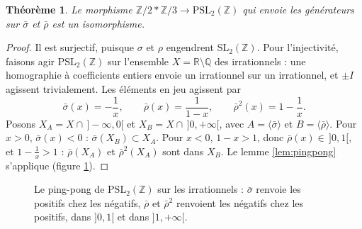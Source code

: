 \documentclass[11pt,a4paper]{article}
\theoremstyle{plain}
\newtheorem{theoreme}{Théorème}[section]
\theoremstyle{definition}
\theoremstyle{remark}
\newcommand{\Z}{\mathbb{Z}}
\newcommand{\Q}{\mathbb{Q}}
\newcommand{\R}{\mathbb{R}}
\newcommand{\SL}{\mathrm{SL}}
\newcommand{\PSL}{\mathrm{PSL}}
\begin{document}
\begin{theoreme}\label{thm:pingpong}
Le morphisme $\Z/2*\Z/3\to\PSL_2(\Z)$ qui envoie les générateurs sur $\bar\sigma$ et $\bar\rho$ est un isomorphisme.
\end{theoreme}

\begin{proof}
Il est surjectif, puisque $\sigma$ et $\rho$ engendrent $\SL_2(\Z)$. Pour l'injectivité, faisons agir $\PSL_2(\Z)$ sur l'ensemble $X=\R\setminus\Q$ des irrationnels : une homographie à coefficients entiers envoie un irrationnel sur un irrationnel, et $\pm I$ agissent trivialement. Les éléments en jeu agissent par
\[
  \bar\sigma(x)=-\frac1x,\qquad \bar\rho(x)=\frac1{1-x},\qquad \bar\rho^2(x)=1-\frac1x .
\]
Posons $X_A=X\cap\,]-\infty,0[$ et $X_B=X\cap\,]0,+\infty[$, avec $A=\langle\bar\sigma\rangle$ et $B=\langle\bar\rho\rangle$. Pour $x>0$, $\bar\sigma(x)<0$ : $\bar\sigma(X_B)\subset X_A$. Pour $x<0$, $1-x>1$, donc $\bar\rho(x)\in\,]0,1[$, et $1-\frac1x>1$ : $\bar\rho(X_A)$ et $\bar\rho^2(X_A)$ sont dans $X_B$. Le lemme \ref{lem:pingpong} s'applique (figure \ref{fig:pingpong}).
\end{proof}

\begin{figure}[h]
\centering
{}
\caption{Le ping-pong de $\PSL_2(\Z)$ sur les irrationnels : $\bar\sigma$ renvoie les positifs chez les négatifs, $\bar\rho$ et $\bar\rho^2$ renvoient les négatifs chez les positifs, dans $]0,1[$ et dans $]1,+\infty[$.}\label{fig:pingpong}
\end{figure}
\end{document}
